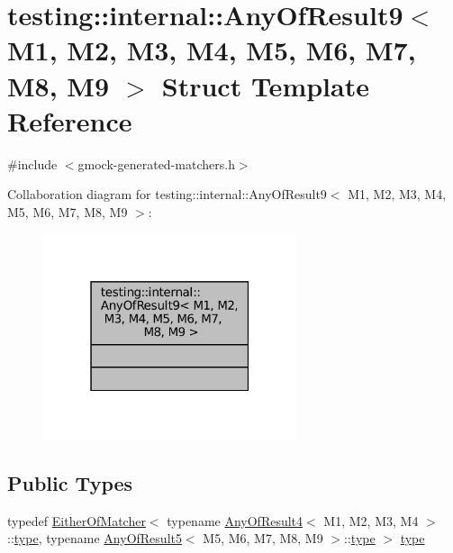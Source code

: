 \hypertarget{structtesting_1_1internal_1_1AnyOfResult9}{}\section{testing\+:\+:internal\+:\+:Any\+Of\+Result9$<$ M1, M2, M3, M4, M5, M6, M7, M8, M9 $>$ Struct Template Reference}
\label{structtesting_1_1internal_1_1AnyOfResult9}


{\ttfamily \#include $<$gmock-\/generated-\/matchers.\+h$>$}



Collaboration diagram for testing\+:\+:internal\+:\+:Any\+Of\+Result9$<$ M1, M2, M3, M4, M5, M6, M7, M8, M9 $>$\+:
\nopagebreak
\begin{figure}[H]
\begin{center}
\leavevmode
\includegraphics[width=211pt]{structtesting_1_1internal_1_1AnyOfResult9__coll__graph}
\end{center}
\end{figure}
\subsection*{Public Types}
\begin{DoxyCompactItemize}
\item 
typedef \hyperlink{classtesting_1_1internal_1_1EitherOfMatcher}{Either\+Of\+Matcher}$<$ typename \hyperlink{structtesting_1_1internal_1_1AnyOfResult4}{Any\+Of\+Result4}$<$ M1, M2, M3, M4 $>$\+::\hyperlink{structtesting_1_1internal_1_1AnyOfResult9_a308935fb02c62f502044dcc7b0a2b464}{type}, typename \hyperlink{structtesting_1_1internal_1_1AnyOfResult5}{Any\+Of\+Result5}$<$ M5, M6, M7, M8, M9 $>$\+::\hyperlink{structtesting_1_1internal_1_1AnyOfResult9_a308935fb02c62f502044dcc7b0a2b464}{type} $>$ \hyperlink{structtesting_1_1internal_1_1AnyOfResult9_a308935fb02c62f502044dcc7b0a2b464}{type}
\end{DoxyCompactItemize}


